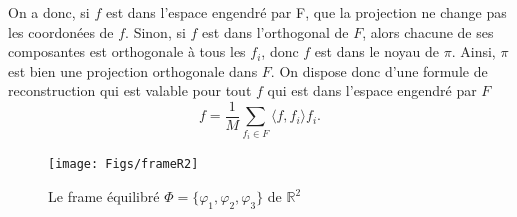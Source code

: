 On a donc, si $f$ est dans l'espace engendré par F, que la projection ne change pas les coordonées de $f$. Sinon, si $f$ est dans l'orthogonal de $F$, alors chacune de ses composantes est orthogonale à tous les $f_i$, donc $f$ est dans le noyau de $\pi$.
Ainsi, $\pi$ est bien une projection orthogonale dans $F$.
\newline
On dispose donc d'une formule de reconstruction qui est valable pour tout $f$ qui est dans l'espace engendré par $F$ 
\begin{equation}
	f = \frac{1}{M} \sum_{f_i \in F} \langle f, f_i \rangle f_i .
\end{equation}
\begin{figure}
	\centering
	\texttt{[image: Figs/frameR2]}
	\caption{Le frame équilibré $\Phi = \{\varphi_1, \varphi_2, \varphi_3\}$ de $\mathbb{R}^2$}
	\label{fig:frameR2}	
\end{figure}
	
